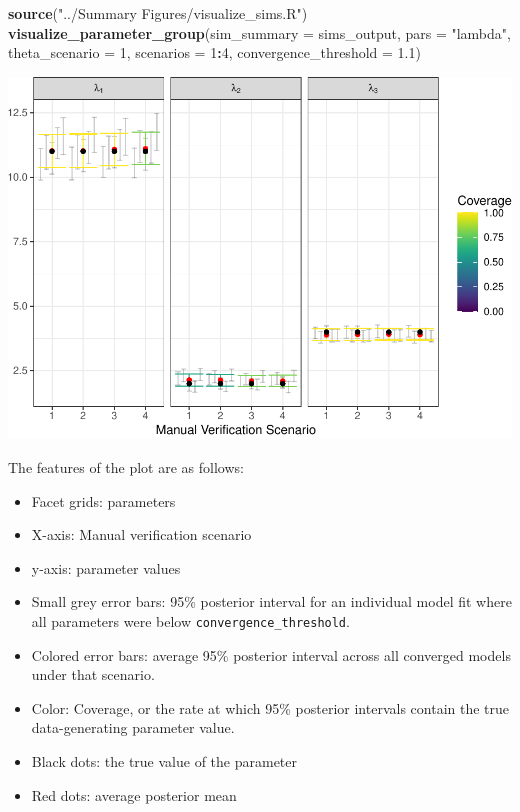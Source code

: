 \documentclass[
]{article}
\newenvironment{Shaded}{\begin{snugshade}}{\end{snugshade}}
\newcommand{\AttributeTok}[1]{\textcolor[rgb]{0.13,0.29,0.53}{#1}}
\newcommand{\DecValTok}[1]{\textcolor[rgb]{0.00,0.00,0.81}{#1}}
\newcommand{\FloatTok}[1]{\textcolor[rgb]{0.00,0.00,0.81}{#1}}
\newcommand{\FunctionTok}[1]{\textcolor[rgb]{0.13,0.29,0.53}{\textbf{#1}}}
\newcommand{\NormalTok}[1]{#1}
\newcommand{\SpecialCharTok}[1]{\textcolor[rgb]{0.81,0.36,0.00}{\textbf{#1}}}
\newcommand{\StringTok}[1]{\textcolor[rgb]{0.31,0.60,0.02}{#1}}
\providecommand{\tightlist}{%
  \setlength{\itemsep}{0pt}\setlength{\parskip}{0pt}}
\begin{document}
\begin{Shaded}
\begin{Highlighting}[]
\FunctionTok{source}\NormalTok{(}\StringTok{"../Summary Figures/visualize\_sims.R"}\NormalTok{)}
\FunctionTok{visualize\_parameter\_group}\NormalTok{(}\AttributeTok{sim\_summary =}\NormalTok{ sims\_output, }
                          \AttributeTok{pars =} \StringTok{"lambda"}\NormalTok{, }
                          \AttributeTok{theta\_scenario =} \DecValTok{1}\NormalTok{, }
                          \AttributeTok{scenarios =} \DecValTok{1}\SpecialCharTok{:}\DecValTok{4}\NormalTok{, }
                          \AttributeTok{convergence\_threshold =} \FloatTok{1.1}\NormalTok{)}
\end{Highlighting}
\end{Shaded}

\includegraphics{Vignette_files/figure-latex/unnamed-chunk-19-1.pdf}

\linespread{1}

The features of the plot are as follows:

\begin{itemize}
\tightlist
\item
  Facet grids: parameters
\item
  X-axis: Manual verification scenario
\item
  y-axis: parameter values
\item
  Small grey error bars: 95\% posterior interval for an individual model fit where all parameters were below \texttt{convergence\_threshold}.
\item
  Colored error bars: average 95\% posterior interval across all converged models under that scenario.
\item
  Color: Coverage, or the rate at which 95\% posterior intervals contain the true data-generating parameter value.
\item
  Black dots: the true value of the parameter
\item
  Red dots: average posterior mean
\end{itemize}
\end{document}
